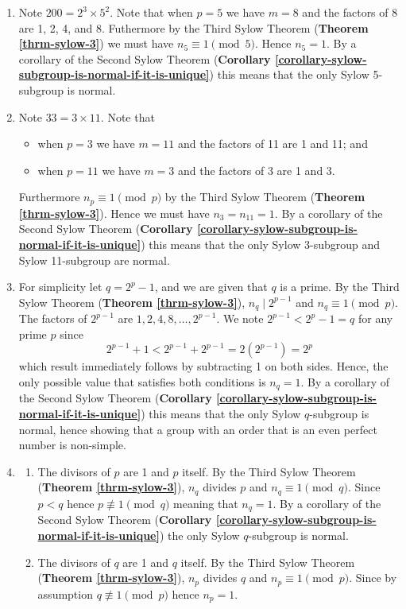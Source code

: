 \begin{enumerate}
    \item Note $200 = 2^3 \times 5^2$. Note that when $p = 5$ we have $m = 8$ and the factors of 8 are 1, 2, 4, and 8. Futhermore by the Third Sylow Theorem (\textbf{Theorem \ref{thrm-sylow-3}}) we must have $n_5 \equiv 1 \pmod 5$. Hence $n_5 = 1$. By a corollary of the Second Sylow Theorem (\textbf{Corollary \ref{corollary-sylow-subgroup-is-normal-if-it-is-unique}}) this means that the only Sylow 5-subgroup is normal.

    \item Note $33 = 3 \times 11$. Note that
    \begin{itemize}
        \item when $p = 3$ we have $m = 11$ and the factors of 11 are 1 and 11; and
        \item when $p = 11$ we have $m = 3$ and the factors of 3 are 1 and 3.
    \end{itemize}
    Furthermore $n_p \equiv 1 \pmod p$ by the Third Sylow Theorem (\textbf{Theorem \ref{thrm-sylow-3}}). Hence we must have $n_3 = n_{11} = 1$. By a corollary of the Second Sylow Theorem (\textbf{Corollary \ref{corollary-sylow-subgroup-is-normal-if-it-is-unique}}) this means that the only Sylow 3-subgroup and Sylow 11-subgroup are normal.

    \item For simplicity let $q = 2^p - 1$, and we are given that $q$ is a prime. By the Third Sylow Theorem (\textbf{Theorem \ref{thrm-sylow-3}}), $n_q \mid 2^{p-1}$ and $n_q \equiv 1 \pmod p$. The factors of $2^{p-1}$ are $1, 2, 4, 8, \dots, 2^{p-1}$. We note $2^{p-1} < 2^p - 1 = q$ for any prime $p$ since
    \[
        2^{p-1} + 1 < 2^{p-1} + 2^{p-1} = 2(2^{p-1}) = 2^p    
    \]
    which result immediately follows by subtracting 1 on both sides. Hence, the only possible value that satisfies both conditions is $n_q = 1$. By a corollary of the Second Sylow Theorem (\textbf{Corollary \ref{corollary-sylow-subgroup-is-normal-if-it-is-unique}}) this means that the only Sylow $q$-subgroup is normal, hence showing that a group with an order that is an even perfect number is non-simple.

    \item \begin{enumerate}[label=(\roman*)]
        \item The divisors of $p$ are 1 and $p$ itself. By the Third Sylow Theorem (\textbf{Theorem \ref{thrm-sylow-3}}), $n_q$ divides $p$ and $n_q \equiv 1 \pmod q$. Since $p < q$ hence $p \not\equiv 1 \pmod q$ meaning that $n_q = 1$. By a corollary of the Second Sylow Theorem (\textbf{Corollary \ref{corollary-sylow-subgroup-is-normal-if-it-is-unique}}) the only Sylow $q$-subgroup is normal.
        \item The divisors of $q$ are 1 and $q$ itself. By the Third Sylow Theorem (\textbf{Theorem \ref{thrm-sylow-3}}), $n_p$ divides $q$ and $n_p \equiv 1 \pmod p$. Since by assumption $q \not\equiv 1 \pmod p$ hence $n_p = 1$.
        

\end{enumerate}
\end{enumerate}
